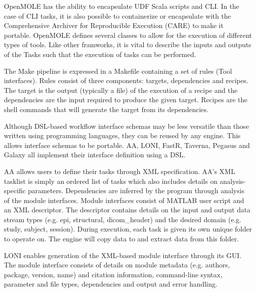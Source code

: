             OpenMOLE has the ability to encapsulate UDF Scala scripts and CLI.
            In the case of CLI tasks, it is also possible to containerize or
            encapsulate with the Comprehensive Archiver for Reproducible
            Execution (CARE) \cite{Janin:2014:CCA:2618137.2618138} to make it
            portable. OpenMOLE defines several classes to allow for the
            execution of different types of tools. Like other framworks, it is
            vital to describe the inputs and outputs of the Tasks such that the
            execution of tasks can be performed. 

            The Make pipeline is expressed in a Makefile containing a set of
            rules (Tool interfaces). Rules consist of three components: targets,
            dependencies and recipes. The target is the output (typically a
            file) of the execution of a recipe and the dependencies are the
            input required to produce the given target. Recipes are the shell
            commands that will generate the target from its dependencies. 

            Although DSL-based workflow interface schemas may be less versatile
            than those written using programming languages, they can be reused
            by any engine. This allows interface schemas to be portable. AA,
            LONI, FastR, Taverna, Pegasus and Galaxy all implement their
            interface definition using a DSL.

            AA allows users to define their tasks through XML specification.
            AA's XML tasklist is simply an ordered list of tasks which also
            includes details on analysis-specific parameters. Dependencies are
            inferred by the program through analysis of the module interfaces.
            Module interfaces consist of MATLAB user script and an XML
            descriptor. The descriptor contains details on the input and output
            data stream types (e.g. epi, structural, dicom\_header) and the
            desired domain (e.g. study, subject, session). During execution,
            each task is given its own unique folder to operate on. The engine
            will copy data to and extract data from this folder.

            LONI enables generation of the XML-based module interface through
            its GUI. The module interface consists of details on module metadata
            (e.g. authors, package, version, name) and citation information,
            command-line syntax, parameter and file types, dependencies and
            output and error handling.

